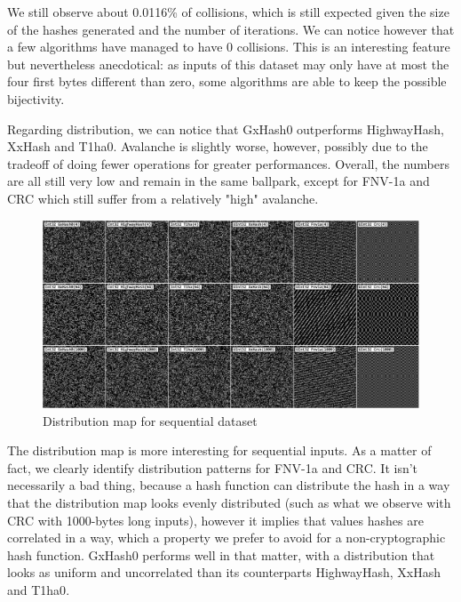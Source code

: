 \documentclass[10pt]{article}
\begin{document}
We still observe about 0.0116\% of collisions, which is still expected given the size of the hashes generated and the number of iterations. We can notice however that a few algorithms have managed to have 0 collisions. This is an interesting feature but nevertheless anecdotical: as inputs of this dataset may only have at most the four first bytes different than zero, some algorithms are able to keep the possible bijectivity.

Regarding distribution, we can notice that GxHash0 outperforms HighwayHash\cite{highwayhash}, XxHash\cite{xxhash} and T1ha0\cite{rust-t1ha}. Avalanche is slightly worse, however, possibly due to the tradeoff of doing fewer operations for greater performances. Overall, the numbers are all still very low and remain in the same ballpark, except for FNV-1a and CRC which still suffer from a relatively "high" avalanche.

\begin{figure}[H]
\centering
\includegraphics[width=1\textwidth]{quality-sequential.png}
\caption{Distribution map for sequential dataset}
\label{fig:quality-sequential}
\end{figure}

The distribution map is more interesting for sequential inputs. As a matter of fact, we clearly identify distribution patterns for FNV-1a and CRC. It isn't necessarily a bad thing, because a hash function can distribute the hash in a way that the distribution map looks evenly distributed (such as what we observe with CRC with 1000-bytes long inputs), however it implies that values hashes are correlated in a way, which a property we prefer to avoid for a non-cryptographic hash function. GxHash0 performs well in that matter, with a distribution that looks as uniform and uncorrelated than its counterparts HighwayHash\cite{highwayhash}, XxHash\cite{xxhash} and T1ha0\cite{rust-t1ha}.
\end{document}
